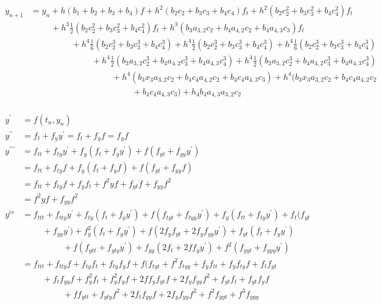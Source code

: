 \documentclass[12pt,a4paper]{article}
\begin{document}
\begin{align*}\tag{1.4.1}\label{1.4.1}
\begin{split}
y_{n+1} &= y_n + h(b_1 + b_2 + b_3 + b_4)f  + h^2(b_2c_2 + b_3c_3 + b_4c_4)f_t + h^2(b_2c_2^2 + b_3c_3^2 + b_4c_4^2)f_t \\
& \hspace{1cm} + h^3\frac{1}{2}(b_2c_2^2 + b_3c_3^2 + b_4c_4^2)f_t + h^3(b_3a_{3,2}c_2 + b_4a_{4,2}c_2 + b_4a_{4,3}c_3)f_t \\
& \hspace{2cm}+ h^4 \frac{1}{6}(b_2c_2^3 + b_3c_3^3 + b_4c_4^3) + h^4 \frac{1}{2}(b_2c_2^3 + b_3c_3^3 + b_4c_4^3)+ h^4\frac{1}{6}(b_2c_2^3 + b_3c_3^3 + b_4c_4^3) \\
& \hspace{3cm} + h^4\frac{1}{2}(b_3a_{3,2}c_2^3 + b_4a_{4,2}c_3^3 + b_4a_{4,3}c_4^3) + h^4\frac{1}{2}(b_3a_{3,2}c_2^3 + b_4a_{4,2}c_3^3 + b_4a_{4,3}c_4^3) \\
& \hspace{4cm}+ h^4(b_3x_3a_{3,2}c_2 + b_4c_4a_{4,2}c_2 + b_4c_4a_{4,3}c_3) + h^4(b_3x_3a_{3,2}c_2 + b_4c_4a_{4,2}c_2 \\
& \hspace{5cm}+ b_4c_4a_{4,3}c_3) + h_4b_4a_{4,3}a_{3,2}c_2
\end{split}
\end{align*}

\begin{align*}
\begin{split}
y^\prime &= f(t_n , y_n) \\
y^{\prime\prime} &= f_t + f_yy^\prime = f_t + f_yf = f_yf \\
y^{\prime\prime\prime} &= f_{tt} + f_{ty}y^\prime + f_y(f_t + f_yy^\prime) + f(f_{yt} + f_{yy}y^\prime) \\
&= f_{tt} + f_{ty}f + f_y(f_t + f_yf) + f(f_{yt} + f_{yy}f)\\
&= f_{tt} + f_{ty}f + f_yf_t + f^2yf + f_{yt}f + f_{yy}f^2 \\
&= f^2yf + f_{yy}f^2 \\
y^{iv} &= f_{ttt} + f_{tty}y^\prime + f_{ty}(f_t + f_yy^\prime) + f(f_{tyt} + f_{tyy}y^\prime) + f_{y}(f_{tt} + f_{ty}y^\prime) + f_{t}(f_{yt} \\
& \hspace{1cm}+ f_{yy}y^\prime) + f_{y}^2(f_t + f_yy^\prime)+ f(2f_yf_{yt} + 2f_yf_{yy}y^\prime) + f_{yt}(f_t + f_yy^\prime) \\
& \hspace{2cm}+ f(f_{ytt} + f_{yty}y^\prime) + f_{yy}(2f_t + 2ff_yy^\prime) + f^2(f_{yyt} + f_{yyy}y^\prime) \\
&= f_{ttt} + f_{tty}f + f_{ty}f_t + f_{ty}f_yf + f(f_{tyt} + f^2f_{tyy} + f_{y}f_{tt} + f_{y}f_{ty}f + f_{t}f_{yt} \\
& \hspace{1cm} + f_{t}f_{yy}f + f_y^2f_t + f_y^2f_yf + 2ff_yf_{yt}f + 2f_yf_{yy}f^2 + f_{yt}f_t + f_{yt}f_yf \\
& \hspace{2cm}+ ff_{ytt} + f_{yty}f^2 + 2f_tf_{yy}f + 2f_yf_{yy}f^2 + f^2f_{yyt} + f^3f_{yyy} 
\end{split}
\end{align*}
\end{document}
